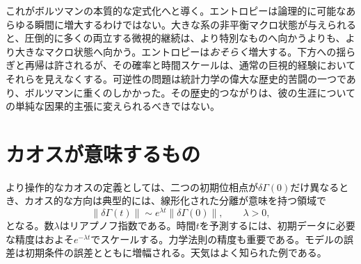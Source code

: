 \begin{classroomqa}
\end{classroomqa}

これがボルツマンの本質的な定式化へと導く。エントロピーは論理的に可能なあらゆる瞬間に増大するわけではない。大きな系の非平衡マクロ状態が与えられると、圧倒的に多くの両立する微視的継続は、より特別なものへ向かうよりも、より大きなマクロ状態へ向かう。エントロピーは\emph{おそらく}増大する。下方への揺らぎと再帰は許されるが、その確率と時間スケールは、通常の巨視的経験においてそれらを見えなくする。可逆性の問題は統計力学の偉大な歴史的苦闘の一つであり、ボルツマンに重くのしかかった。その歴史的つながりは、彼の生涯についての単純な因果的主張に変えられるべきではない。

\section{カオスが意味するもの}

より操作的なカオスの定義としては、二つの初期位相点が\(\delta\Gamma(0)\)だけ異なるとき、カオス的な方向は典型的には、線形化された分離が意味を持つ領域で
\begin{equation}
 \lVert\delta\Gamma(t)\rVert
 \sim e^{\lambda t}\lVert\delta\Gamma(0)\rVert,
 \qquad \lambda>0,
 \label{eq:sm7-lyapunov-growth}
\end{equation}
となる。数\(\lambda\)はリアプノフ指数である。時間\(t\)を予測するには、初期データに必要な精度はおよそ\(e^{-\lambda t}\)でスケールする。力学法則の精度も重要である。モデルの誤差は初期条件の誤差とともに増幅される。天気はよく知られた例である。

\begin{classroomqa}
\end{classroomqa}

